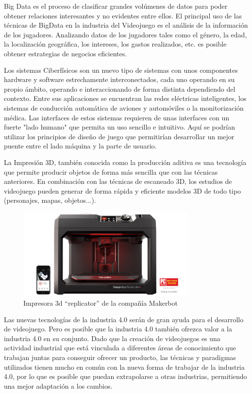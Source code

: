 Big Data es el proceso de clasificar grandes volúmenes de datos para poder obtener relaciones interesantes y no evidentes entre ellos. El principal uso de las técnicas de BigData en la industria del Videojuego es el análisis de la información de los jugadores. Analizando datos de los jugadores tales como el género, la edad, la localización geográfica, los intereses, los gastos realizados, etc. es posible obtener estrategias de negocios eficientes.

Los sistemas Ciberfísicos son un nuevo tipo de sistemas con unos componentes hardware y software estrechamente interconectados, cada uno operando en su propio ámbito, operando e interaccionando de forma distinta dependiendo del contexto\cite{cyber_physics}. Entre sus aplicaciones se encuentran las redes eléctricas inteligentes, los sistemas de conducción automática de aviones y automóviles o la monitorización médica. Las interfaces de estos sistemas requieren de unas interfaces con un fuerte "lado humano" que permita un uso sencillo e intuitivo. Aquí se podrían utilizar los principios de diseño de juego que permitirían desarrollar un mejor puente entre el lado máquina y la parte de usuario.

La Impresión 3D, también conocida como la producción aditiva es una tecnología que permite producir objetos de forma más sencilla que con las técnicas anteriores. En combinación con las técnicas de escaneado 3D, los estudios de videojuego pueden generar de forma rápida y eficiente modelos 3D de todo tipo (personajes, mapas, objetos...).

\begin{figure}[h]
    \centering
    \includegraphics[width=0.8\textwidth]{images/estadodelarte/mercado/impresion-3d}
    \caption{Impresora 3d ``replicator'' de la compañía Makerbot}
\end{figure}

Las nuevas tecnologías de la industria 4.0 serán de gran ayuda para el desarrollo de videojuego. Pero es posible que la industria 4.0 también ofrezca valor a la industria 4.0 en su conjunto. Dado que la creación de videojuegos es una actividad industrial que está vinculada a diferentes áreas de conocimiento que trabajan juntas para conseguir ofrecer un producto, las técnicas y paradigmas utilizados tienen mucho en común con la nueva forma de trabajar de la industria 4.0, por lo que es posible que puedan extrapolarse a otras industrias, permitiendo una mejor adaptación a los cambios.
